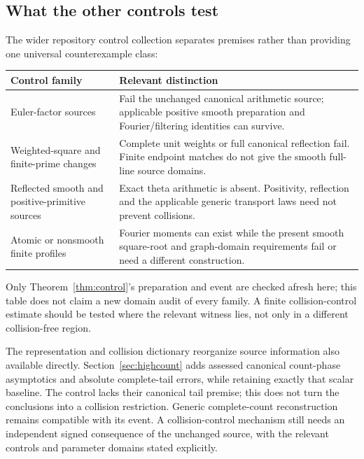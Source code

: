 \subsection{What the other controls test}
The wider repository control collection \cite{CollisionControls} separates
premises rather than providing one universal counterexample class:
\begin{center}\small
\begin{tabularx}{\textwidth}{@{}>{\raggedright\arraybackslash}p{}Y@{}}
\toprule
Control family & Relevant distinction \\\midrule
Euler-factor sources & Fail the unchanged canonical arithmetic source; applicable positive smooth preparation and Fourier/filtering identities can survive. \\
Weighted-square and finite-prime changes & Complete unit weights or full canonical reflection fail. Finite endpoint matches do not give the smooth full-line source domains. \\
Reflected smooth and positive-primitive sources & Exact theta arithmetic is absent. Positivity, reflection and the applicable generic transport laws need not prevent collisions. \\
Atomic or nonsmooth finite profiles & Fourier moments can exist while the present smooth square-root and graph-domain requirements fail or need a different construction. \\
\bottomrule
\end{tabularx}
\end{center}
Only Theorem~\ref{thm:control}'s preparation and event are checked afresh
here; this table does not claim a new domain audit of every family. A finite
collision-control estimate should be tested where the relevant witness lies,
not only in a different collision-free region.

The representation and collision dictionary reorganize source information
also available directly. Section~\ref{sec:highcount} adds assessed
canonical count-phase asymptotics and absolute complete-tail errors, while
retaining exactly that scalar baseline. The control lacks their canonical
tail premise; this does not turn the conclusions into a collision
restriction. Generic complete-count reconstruction remains compatible with
its event. A collision-control mechanism still needs an independent signed
consequence of the unchanged source, with the relevant controls and
parameter domains stated explicitly.
